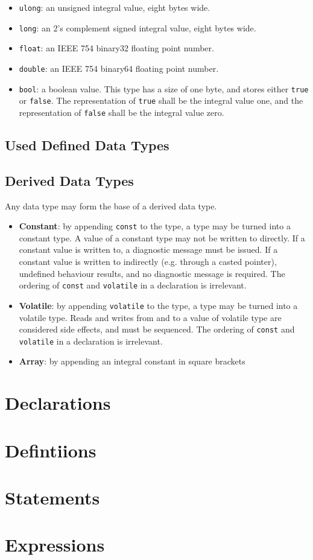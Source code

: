 \documentclass[letterpaper,12pt]{book}
\begin{document}
\begin{itemize}
	\item \texttt{ulong}: an unsigned integral value, eight bytes wide.
	
	\item \texttt{long}: an 2's complement signed integral value, eight bytes wide.
	
	\item \texttt{float}: an IEEE 754 binary32 floating point number.
	
	\item \texttt{double}: an IEEE 754 binary64 floating point number.
	
	\item \texttt{bool}: a boolean value. This type has a size of one byte, and stores either \texttt{true} or \texttt{false}. The representation of \texttt{true} shall be the integral value one, and the representation of \texttt{false} shall be the integral value zero.
\end{itemize}

\section{Used Defined Data Types}

\section{Derived Data Types}

Any data type may form the base of a derived data type.

\begin{itemize}
	\item \textbf{Constant}: by appending \texttt{const} to the type, a type may be turned into a constant type. A value of a constant type may not be written to directly. If a constant value is written to, a diagnostic message must be issued. If a constant value is written to indirectly (e.g. through a casted pointer), undefined behaviour results, and no diagnostic message is required. The ordering of \texttt{const} and \texttt{volatile} in a declaration is irrelevant.
	
	\item \textbf{Volatile}: by appending \texttt{volatile} to the type, a type may be turned into a volatile type. Reads and writes from and to a value of volatile type are considered side effects, and must be sequenced. The ordering of \texttt{const} and \texttt{volatile} in a declaration is irrelevant.
	
	\item \textbf{Array}: by appending an integral constant in square brackets
\end{itemize}

\chapter{Declarations}

\chapter{Defintiions}

\chapter{Statements}

\chapter{Expressions}
\end{document}
